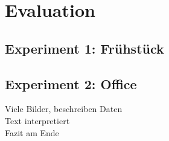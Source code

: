 \chapter{Evaluation}\label{ch:evaluation}
\section{Experiment 1: Frühstück}
\section{Experiment 2: Office}
Viele Bilder, beschreiben Daten\\
Text interpretiert\\
Fazit am Ende \\


\begin{deprecated}
\cite{davis93}


\end{deprecated}
